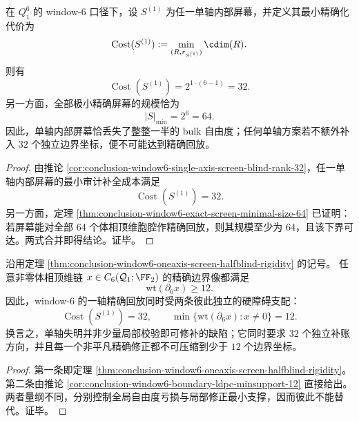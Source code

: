 \begin{theorem}\label{thm:conclusion-window6-oneaxis-screen-halfblind-rigidity}
在 \(Q_1^6\) 的 window-\(6\) 口径下，设 \(S^{(1)}\) 为任一单轴内部屏幕，并定义其最小精确化代价为
\[
\operatorname{Cost}(S^{(1)}):=\min_{(R,r_{S^{(1)}})}\cdim(R).
\]
则有
\[
\operatorname{Cost}(S^{(1)})=2^{1\cdot(6-1)}=32.
\]
另一方面，全部极小精确屏幕的规模恰为
\[
|S|_{\min}=2^6=64.
\]
因此，单轴内部屏幕恰丢失了整整一半的 bulk 自由度；任何单轴方案若不额外补入 \(32\) 个独立边界坐标，便不可能达到精确回放。
\end{theorem}
\begin{proof}
由推论 \ref{cor:conclusion-window6-single-axis-screen-blind-rank-32}，任一单轴内部屏幕的最小审计补全成本满足
\[
\operatorname{Cost}(S^{(1)})=32.
\]
另一方面，定理 \ref{thm:conclusion-window6-exact-screen-minimal-size-64} 已证明：若屏幕能对全部 \(64\) 个体相顶维胞腔作精确回放，则其规模至少为 \(64\)，且该下界可达。两式合并即得结论。证毕。
\end{proof}

\begin{corollary}\label{cor:conclusion-window6-oneaxis-exact-replay-two-scale-obstruction}
沿用定理 \ref{thm:conclusion-window6-oneaxis-screen-halfblind-rigidity} 的记号。
任意非零体相顶维链 \(x\in C_6(\mathcal Q_1;\FF_2)\) 的精确边界像都满足
\[
\mathrm{wt}(\partial_6 x)\ge 12.
\]
因此，window-\(6\) 的一轴精确回放同时受两条彼此独立的硬障碍支配：
\[
\operatorname{Cost}(S^{(1)})=32,
\qquad
\min\{\mathrm{wt}(\partial_6 x):x\neq 0\}=12.
\]
换言之，单轴失明并非少量局部校验即可修补的缺陷；它同时要求 \(32\) 个独立补账方向，并且每一个非平凡精确修正都不可压缩到少于 \(12\) 个边界坐标。
\end{corollary}
\begin{proof}
第一条即定理 \ref{thm:conclusion-window6-oneaxis-screen-halfblind-rigidity}。
第二条由推论 \ref{cor:conclusion-window6-boundary-ldpc-minsupport-12} 直接给出。
两者量纲不同，分别控制全局自由度亏损与局部修正最小支撑，因而彼此不能替代。证毕。
\end{proof}
